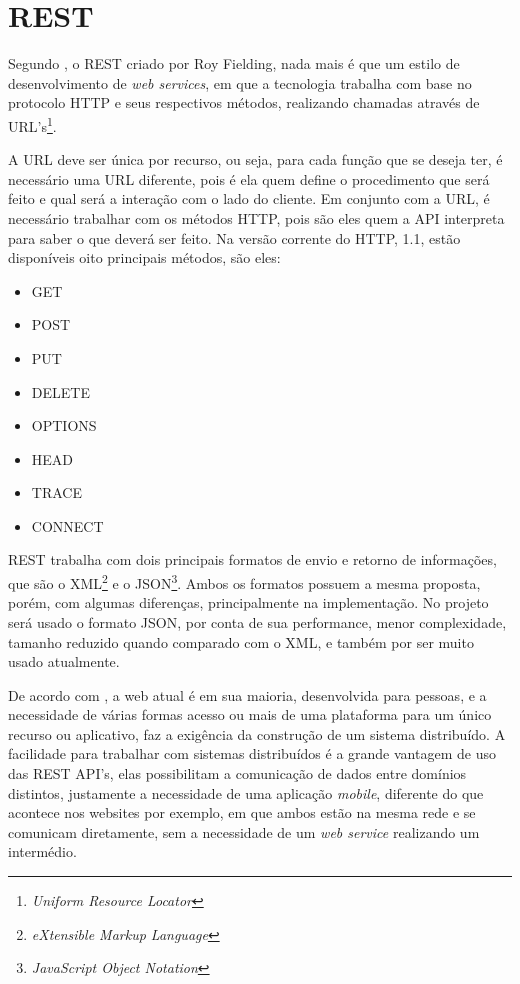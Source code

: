 \section{REST}
	\par Segundo , o REST criado por Roy Fielding, nada mais é que um estilo de desenvolvimento de \textit{web services}, em que a tecnologia trabalha com base no protocolo HTTP e seus respectivos métodos, realizando chamadas através de URL's\footnote{\textit{Uniform Resource Locator}}. 
	\par A URL deve ser única por recurso, ou seja, para cada função que se deseja ter, é necessário uma URL diferente, pois é ela quem define o procedimento que será feito e qual será a interação com o lado do cliente. Em conjunto com a URL, é necessário trabalhar com os métodos HTTP, pois são eles quem a API interpreta para saber o que deverá ser feito. Na versão corrente do HTTP, 1.1, estão disponíveis oito principais métodos, são eles:
	\begin{itemize}
	 	\item GET
	 	\item POST
	 	\item PUT
	 	\item DELETE
	 	\item OPTIONS
	 	\item HEAD
	 	\item TRACE
	   	\item CONNECT
	\end{itemize}
	\par REST trabalha com dois principais formatos de envio e retorno de informações, que são o XML\footnote{\textit{eXtensible Markup Language}} e o JSON\footnote{\textit{JavaScript Object Notation}}. Ambos os formatos possuem a mesma proposta, porém, com algumas diferenças, principalmente na implementação. No projeto será usado o formato JSON, por conta de sua performance, menor complexidade, tamanho reduzido quando comparado com o XML, e também por ser muito usado atualmente.
	\par De acordo com , a web atual é em sua maioria, desenvolvida para pessoas, e a necessidade de várias formas acesso ou mais de uma plataforma para um único recurso ou aplicativo, faz a exigência da construção de um sistema distribuído. A facilidade para trabalhar com sistemas distribuídos é a grande vantagem de uso das REST API's, elas possibilitam a comunicação de dados entre domínios distintos, justamente a necessidade de uma aplicação \textit{mobile}, diferente do que acontece nos websites por exemplo, em que ambos estão na mesma rede e se comunicam diretamente, sem a necessidade de um \textit{web service} realizando um intermédio.

